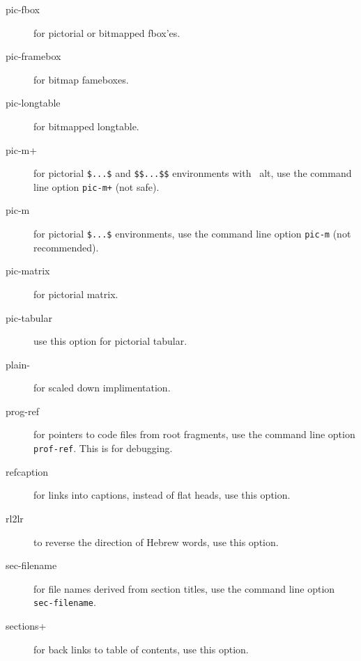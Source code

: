 \begin{description}
\item[pic-fbox] for pictorial or bitmapped fbox'es.

\item[pic-framebox] for bitmap fameboxes.

\item[pic-longtable] for bitmapped longtable.

\item[pic-m+] for pictorial \verb=$...$= and \verb=$$...$$=
  environments with \latex\ alt, use the command line option
  \verb=pic-m+= (not safe).

\item[pic-m] for pictorial \verb=$...$= environments, use the command
  line option \verb=pic-m= (not recommended).

\item[pic-matrix] for pictorial matrix.




\item[pic-tabular] use this option for pictorial tabular.

\item[plain-] for scaled down implimentation.




\item[prog-ref] for pointers to code files from root fragments, use
  the command line option \verb=prof-ref=. This is for debugging.

\item[refcaption] for links into captions, instead of flat heads, use
  this option.

\item[rl2lr] to reverse the direction of Hebrew words, use this
  option.

\item[sec-filename] for file names derived from section titles, use
  the command line option \verb=sec-filename=.

\item[sections+] for back links to table of contents, use this option.


\end{description}
